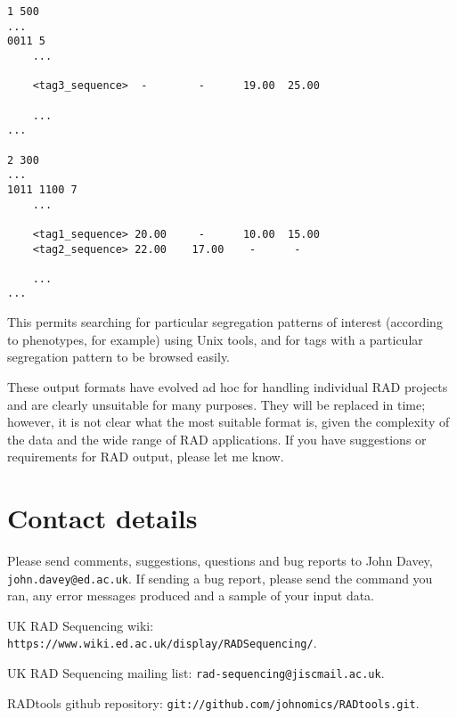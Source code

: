 \documentclass[a4paper]{article}
\begin{document}
\begin{verbatim}
1 500
...
0011 5
    ...

    <tag3_sequence>  -        -      19.00  25.00

    ...
...

2 300
...
1011 1100 7
    ...

    <tag1_sequence> 20.00     -      10.00  15.00
    <tag2_sequence> 22.00    17.00    -      -

    ...
...
\end{verbatim}

This permits searching for particular segregation patterns of interest (according to phenotypes, for example) using Unix tools, and for tags with a particular segregation pattern to be browsed easily.

These output formats have evolved ad hoc for handling individual RAD projects and are clearly unsuitable for many purposes. They will be replaced in time; however, it is not clear what the most suitable format is, given the complexity of the data and the wide range of RAD applications. If you have suggestions or requirements for RAD output, please let me know.


\section{Contact details}

Please send comments, suggestions, questions and bug reports to John Davey, \verb|john.davey@ed.ac.uk|. If sending a bug report, please send the command you ran, any error messages produced and a sample of your input data.

UK RAD Sequencing wiki: \verb|https://www.wiki.ed.ac.uk/display/RADSequencing/|.

UK RAD Sequencing mailing list: \verb|rad-sequencing@jiscmail.ac.uk|.

RADtools github repository: \verb|git://github.com/johnomics/RADtools.git|.
\end{document}

